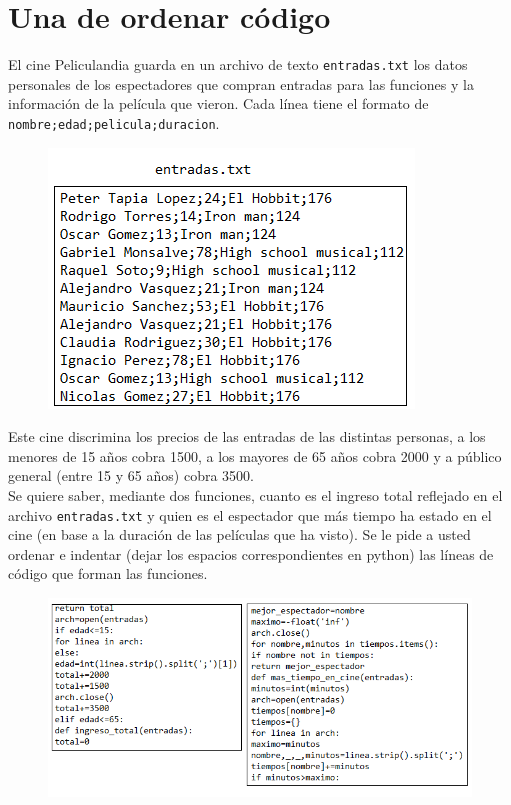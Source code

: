 \section{Una de ordenar código}

El cine Peliculandia guarda en un archivo de texto \texttt{entradas.txt} los datos personales de los espectadores que compran entradas para las funciones y la información de la película que vieron. Cada línea tiene el formato de \texttt{nombre;edad;pelicula;duracion}. 

\begin{figure}[h]
    \centering
    \includegraphics[scale=0.9]{Guia/entradas.png}
\end{figure}

Este cine discrimina los precios de las entradas de las distintas personas, a los menores de 15 años cobra 1500, a los mayores de 65 años cobra 2000 y a público general (entre 15 y 65 años) cobra 3500.
\\
Se quiere saber, mediante dos funciones, cuanto es el ingreso total reflejado en el archivo \texttt{entradas.txt} y quien es el espectador que más tiempo ha estado en el cine (en base a la duración de las películas que ha visto). Se le pide a usted ordenar e indentar (dejar los espacios correspondientes en python) las líneas de código que forman las funciones.

\begin{figure}[h]
    \centering
    \includegraphics[scale=0.9]{Guia/funciones.png}
\end{figure}